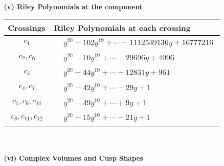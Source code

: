 \documentclass[1p]{elsarticle_modified}
\theoremstyle{definition}
\begin{document}
\newpage\renewcommand{\arraystretch}{1}
\flushleft \textbf{(v) Riley Polynomials at the component}\newline \\
\begin{tabular}{m{50pt}|m{274pt}}
Crossings & \hspace{64pt}Riley Polynomials at each crossing \\
\hline $$\begin{aligned}c_{1}\end{aligned}$$&$\begin{aligned}
&y^{20}+102 y^{19}+\cdots-1112539136 y+16777216
\end{aligned}$\\
\hline $$\begin{aligned}c_{2},c_{6}\end{aligned}$$&$\begin{aligned}
&y^{20}-10 y^{19}+\cdots-29696 y+4096
\end{aligned}$\\
\hline $$\begin{aligned}c_{3}\end{aligned}$$&$\begin{aligned}
&y^{20}+44 y^{19}+\cdots-12831 y+961
\end{aligned}$\\
\hline $$\begin{aligned}c_{4},c_{7}\end{aligned}$$&$\begin{aligned}
&y^{20}+42 y^{19}+\cdots-29 y+1
\end{aligned}$\\
\hline $$\begin{aligned}c_{5},c_{9},c_{10}\end{aligned}$$&$\begin{aligned}
&y^{20}+49 y^{19}+\cdots+9 y+1
\end{aligned}$\\
\hline $$\begin{aligned}c_{8},c_{11},c_{12}\end{aligned}$$&$\begin{aligned}
&y^{20}+15 y^{19}+\cdots-21 y+1
\end{aligned}$\\
\hline
\end{tabular}\\~\\
\newpage\flushleft \textbf{(vi) Complex Volumes and Cusp Shapes}
\end{document}
